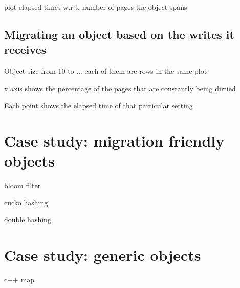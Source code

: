 plot elapsed times w.r.t. number of pages the object spans

\subsection{Migrating an object based on the writes it receives}
Object size from 10 to ... each of them are rows in the same plot

x axis shows the percentage of the pages that are constantly being dirtied

Each point shows the elapsed time of that particular setting


\section{Case study: migration friendly objects}

bloom filter

cucko hashing

double hashing

\section{Case study: generic objects}

c++ map



